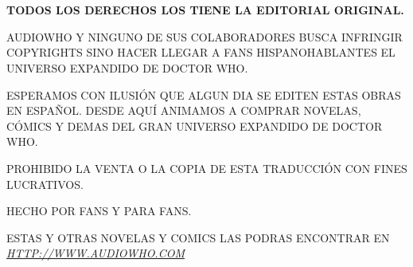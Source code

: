\chapter*{}

\mbox{}

\vfill

\begin{center}

\textbf{TODOS LOS DERECHOS LOS TIENE LA EDITORIAL ORIGINAL.}

\vspace{2mm}

AUDIOWHO Y NINGUNO DE SUS COLABORADORES BUSCA INFRINGIR COPYRIGHTS SINO HACER LLEGAR A FANS HISPANOHABLANTES EL UNIVERSO EXPANDIDO DE DOCTOR WHO.

\vspace{2mm}

ESPERAMOS CON ILUSIÓN QUE ALGUN DIA SE EDITEN ESTAS OBRAS EN ESPAÑOL. DESDE AQUÍ ANIMAMOS A COMPRAR NOVELAS, CÓMICS Y DEMAS DEL GRAN UNIVERSO EXPANDIDO DE DOCTOR WHO.

\vspace{2mm}

PROHIBIDO LA VENTA O LA COPIA DE ESTA TRADUCCIÓN CON FINES LUCRATIVOS.

\vspace{2mm}

HECHO POR FANS Y PARA FANS.

\vspace{2mm}

ESTAS Y OTRAS NOVELAS Y COMICS LAS PODRAS ENCONTRAR EN  \href{http://www.audiowho.com}{\textit{HTTP://WWW.AUDIOWHO.COM}}
\end{center}